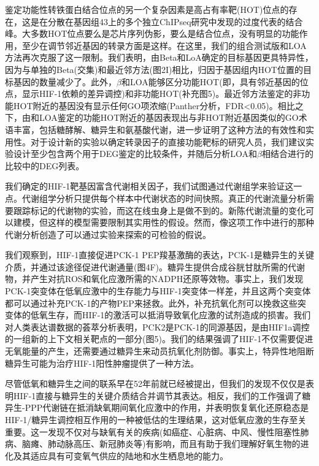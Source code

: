 \documentclass{ctexart}
\begin{document}
        鉴定功能性转铁蛋白结合位点的另一个复杂因素是高占有率靶(HOT)位点的存在，这是在分散在基因组43上的多个独立ChIPseq研究中发现的过度代表的结合峰。大多数HOT位点要么是芯片序列伪影，要么是结合位点，没有明显的功能作用，至少在调节邻近基因的转录方面是这样。在这里，我们的组合测试版和LOA方法再次克服了这一限制。我们表明，由Beta和LoA确定的目标基因更具特异性，因为与单独的Beta(交集)和最近邻方法(图2I)相比，归因于基因组内HOT位置的目标基因的数量减少了。此外，$\beta$和LOA能够区分功能HOT(即，具有邻近基因的位点，显示HIF-1依赖的差异调控)和非功能HOT(补充图5)。最近邻方法鉴定的非功能HOT附近的基因没有显示任何GO项浓缩(Panther分析，FDR<0.05)。相比之下，由和LOA鉴定的功能HOT附近的基因表现出与非HOT附近基因类似的GO术语丰富，包括糖酵解、糖异生和氨基酸代谢，进一步证明了这种方法的有效性和实用性。对于设计新的实验以确定转录因子的直接功能靶标的研究人员，我们建议实验设计至少包含两个用于DEG鉴定的比较条件，并随后分析LOA和$\beta$相结合进行的比较中的DEG列表。

        我们确定的HIF-1靶基因富含代谢相关因子，我们试图通过代谢组学来验证这一点。代谢组学分析只提供每个样本中代谢状态的时间快照。真正的代谢流量分析需要跟踪标记的代谢物的实验，而这在线虫身上是做不到的。新陈代谢流量的变化可以建模，但这样的模型需要限制其实用性的假设。然而，像这项工作中进行的那种代谢分析创造了可以通过实验来探索的可检验的假说。

        我们观察到，HIF-1直接促进PCK-1 PEP羧基激酶的表达，PCK-1是糖异生的关键介质，并通过该途径促进代谢通量(图4F)。糖异生提供合成谷胱甘肽所需的代谢物，并产生对抗ROS和氧化应激所需的NADPH还原等效物。事实上，我们发现PCK-1突变体在低氧应激中的生存能力与HIF-1突变体一样差，并且这两个突变体都可以通过补充PCK-1的产物PEP来拯救。此外，补充抗氧化剂可以挽救这些突变体的低氧生存，而HIF-1的激活可以抵消导致氧化应激的试剂造成的损害。我们对人类表达谱数据的荟萃分析表明，PCK2是PCK-1的同源基因，是由HIF1a调控的一组新的上下文相关靶点的一部分(图5)。我们的结果强调了HIF-1不仅需要促进无氧能量的产生，还需要通过糖异生来动员抗氧化剂防御。事实上，特异性地阻断糖异生可能为治疗HIF-1阳性肿瘤提供了一种方法。

        尽管低氧和糖异生之间的联系早在52年前就已经被提出，但我们的发现不仅仅是表明HIF-1直接与糖异生的关键介质结合并调节其表达。相反，我们的工作强调了糖异生-PPP代谢链在抵消缺氧期间氧化应激中的作用，并表明恢复氧化还原稳态是HIF-1/糖异生调控相互作用的一种被低估的生理结果，这对低氧应激的生存至关重要。这一发现不仅对与缺氧有关的疾病(如癌症、心脏病、中风、慢性阻塞性肺病、脑瘫、肺动脉高压、新冠肺炎等)有影响，而且有助于我们理解好氧生物的进化及其适应具有可变氧气供应的陆地和水生栖息地的能力。
\end{document}
